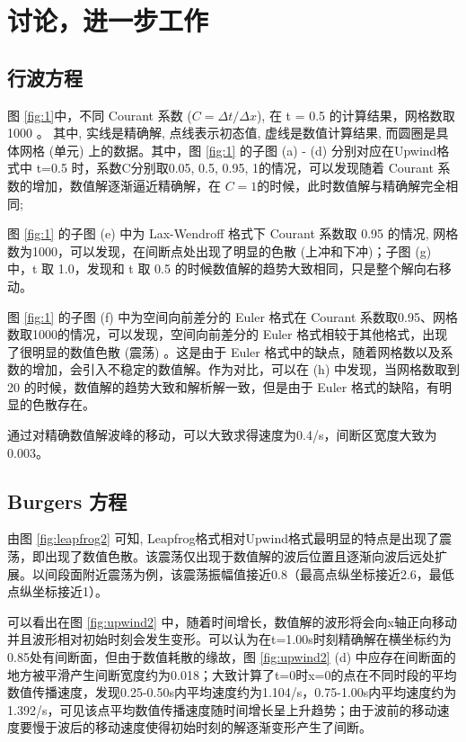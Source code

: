 \documentclass{article}
\begin{document}
\section{讨论，进一步工作}
\subsection{行波方程}

图 \ref{fig:1}中，不同 Courant 系数 ($C = \Delta t/\Delta x$), 在 t = 0.5 的计算结果，网格数取 1000 。 其中, 实线是精确解, 点线表示初态值, 虚线是数值计算结果, 而圆圈是具体网格 (单元) 上的数据。其中，图 \ref{fig:1} 的子图 (a) - (d) 分别对应在Upwind格式中 t=0.5 时，系数C分别取0.05, 0.5, 0.95, 1的情况，可以发现随着 Courant 系数的增加，数值解逐渐逼近精确解，在 $C=1$的时候，此时数值解与精确解完全相同;

图 \ref{fig:1} 的子图 (e) 中为 Lax-Wendroff 格式下 Courant 系数取 0.95 的情况, 网格数为1000，可以发现，在间断点处出现了明显的色散 (上冲和下冲)；子图 (g) 中，t 取 1.0，发现和 t 取 0.5 的时候数值解的趋势大致相同，只是整个解向右移动。

图 \ref{fig:1} 的子图 (f) 中为空间向前差分的 Euler 格式在 Courant 系数取0.95、网格数取1000的情况，可以发现，空间向前差分的 Euler 格式相较于其他格式，出现了很明显的数值色散 (震荡) 。这是由于 Euler 格式中的缺点，随着网格数以及系数的增加，会引入不稳定的数值解。作为对比，可以在 (h) 中发现，当网格数取到 20 的时候，数值解的趋势大致和解析解一致，但是由于 Euler 格式的缺陷，有明显的色散存在。

通过对精确数值解波峰的移动，可以大致求得速度为0.4/s，间断区宽度大致为0.003。

\subsection{Burgers 方程}

由图 \ref{fig:leapfrog2} 可知,  Leapfrog格式相对Upwind格式最明显的特点是出现了震荡，即出现了数值色散。该震荡仅出现于数值解的波后位置且逐渐向波后远处扩展。以间段面附近震荡为例，该震荡振幅值接近0.8（最高点纵坐标接近2.6，最低点纵坐标接近1）。

可以看出在图 \ref{fig:upwind2} 中，随着时间增长，数值解的波形将会向x轴正向移动并且波形相对初始时刻会发生变形。可以认为在t=1.00s时刻精确解在横坐标约为0.85处有间断面，但由于数值耗散的缘故，图 \ref{fig:upwind2} (d) 中应存在间断面的地方被平滑产生间断宽度约为0.018；大致计算了t=0时x=0的点在不同时段的平均数值传播速度，发现0.25-0.50s内平均速度约为1.104/s，0.75-1.00s内平均速度约为1.392/s，可见该点平均数值传播速度随时间增长呈上升趋势；由于波前的移动速度要慢于波后的移动速度使得初始时刻的解逐渐变形产生了间断。
\end{document}
